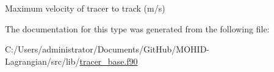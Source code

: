 Maximum velocity of tracer to track (m/s) 



The documentation for this type was generated from the following file\+:\begin{DoxyCompactItemize}
\item 
C\+:/\+Users/administrator/\+Documents/\+Git\+Hub/\+M\+O\+H\+I\+D-\/\+Lagrangian/src/lib/\mbox{\hyperlink{tracer__base_8f90}{tracer\+\_\+base.\+f90}}\end{DoxyCompactItemize}
